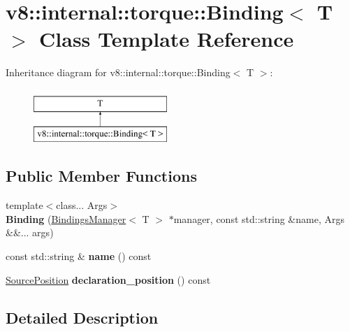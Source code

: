 \hypertarget{classv8_1_1internal_1_1torque_1_1Binding}{}\section{v8\+:\+:internal\+:\+:torque\+:\+:Binding$<$ T $>$ Class Template Reference}
\label{classv8_1_1internal_1_1torque_1_1Binding}
Inheritance diagram for v8\+:\+:internal\+:\+:torque\+:\+:Binding$<$ T $>$\+:\begin{figure}[H]
\begin{center}
\leavevmode
\includegraphics[height=2.000000cm]{classv8_1_1internal_1_1torque_1_1Binding}
\end{center}
\end{figure}
\subsection*{Public Member Functions}
\begin{DoxyCompactItemize}
\item 
\mbox{\label{classv8_1_1internal_1_1torque_1_1Binding_a4a0713b448b7ce473d037267f6d6d07b}} 
{\footnotesize template$<$class... Args$>$ }\\{\bfseries Binding} (\mbox{\hyperlink{classv8_1_1internal_1_1torque_1_1BindingsManager}{Bindings\+Manager}}$<$ T $>$ $\ast$manager, const std\+::string \&name, Args \&\&... args)
\item 
\mbox{\label{classv8_1_1internal_1_1torque_1_1Binding_a4ee19485853aa217f1bba23522e8280b}} 
const std\+::string \& {\bfseries name} () const
\item 
\mbox{\label{classv8_1_1internal_1_1torque_1_1Binding_af9129682d7b70cc54b14b3d877349ebb}} 
\mbox{\hyperlink{structv8_1_1internal_1_1torque_1_1SourcePosition}{Source\+Position}} {\bfseries declaration\+\_\+position} () const
\end{DoxyCompactItemize}


\subsection{Detailed Description}
